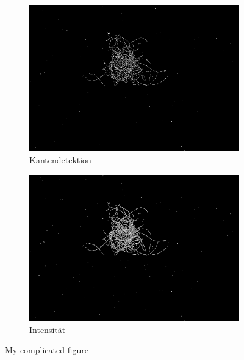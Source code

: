 \documentclass[german,a4paper, 12pt]{llncs}
\begin{document}
\begin{figure}[H]
	\medskip
	\begin{subfigure}{0.48\textwidth}
		\includegraphics[width=\linewidth]{figBina/04edges.png}
		\caption{Kantendetektion} \label{fig:e}
	\end{subfigure}\hspace*{\fill}
	\begin{subfigure}{0.48\textwidth}
		\includegraphics[width=\linewidth]{figBina/05intenstiy.png}
		\caption{Intensität} \label{fig:BinaRawIntensity}
	\end{subfigure}
	
	
	\caption{My complicated figure} \label{fig:1}
\end{figure}
\end{document}
